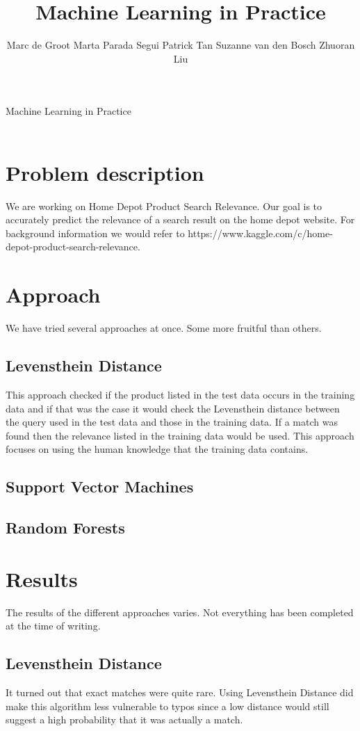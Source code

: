 \documentclass{article}
\title{Machine Learning in Practice}
\author{
Marc de Groot
Marta Parada Segui
Patrick Tan
Suzanne van den Bosch
Zhuoran Liu}
\begin{document}
{\Huge Machine Learning in Practice}
\\
\\

\section{Problem description}

We are working on Home Depot Product Search Relevance. Our goal is to accurately predict the relevance of a search result on the home depot website. For background information we would refer to https://www.kaggle.com/c/home-depot-product-search-relevance.

\section{Approach}

We have tried several approaches at once. Some more fruitful than others.

\subsection{Levensthein Distance}
This approach checked if the product listed in the test data occurs in the training data and if that was the case it would check the Levensthein distance between the query used in the test data and those in the training data. If a match was found then the relevance listed in the training data would be used. This approach focuses on using the human knowledge that the training data contains.

\subsection{Support Vector Machines}

\subsection{Random Forests}

\section{Results}

The results of the different approaches varies. Not everything has been completed at the time of writing.

\subsection{Levensthein Distance}
It turned out that exact matches were quite rare. Using Levensthein Distance did make this algorithm less vulnerable to typos since a low distance would still suggest a high probability that it was actually a match.
\end{document}
